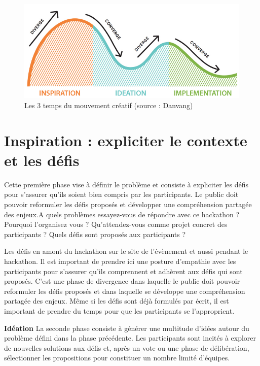 \documentclass[]{book}
\begin{document}
\begin{figure}

{\centering \includegraphics[width=0.7\linewidth]{./img/ideo} 

}

\caption{Les 3 temps du mouvement créatif (source : Danvang)}\label{fig:unnamed-chunk-15}
\end{figure}

\section{Inspiration : expliciter le contexte et les
défis}\label{inspiration-expliciter-le-contexte-et-les-defis}

Cette première phase vise à définir le problème et consiste à expliciter
les défis pour s'assurer qu'ils soient bien compris par les
participants. Le public doit pouvoir reformuler les défis proposés et
développer une compréhension partagée des enjeux.A quels problèmes
essayez-vous de répondre avec ce hackathon ? Pourquoi l'organisez vous ?
Qu'attendez-vous comme projet concret des participants ? Quels défis
sont proposés aux participants ?

Les défis en amont du hackathon sur le site de l'évènement et aussi
pendant le hackathon. Il est important de prendre ici une posture
d'empathie avec les participants pour s'assurer qu'ils comprennent et
adhèrent aux défis qui sont proposés. C'est une phase de divergence dans
laquelle le public doit pouvoir reformuler les défis proposés et dans
laquelle se développe une compréhension partagée des enjeux. Même si les
défis sont déjà formulés par écrit, il est important de prendre du temps
pour que les participants se l'approprient.

\textbf{Idéation} La seconde phase consiste à générer une multitude
d'idées autour du problème défini dans la phase précédente. Les
participants sont incités à explorer de nouvelles solutions aux défis
et, après un vote ou une phase de délibération, sélectionner les
propositions pour constituer un nombre limité d'équipes.
\end{document}
